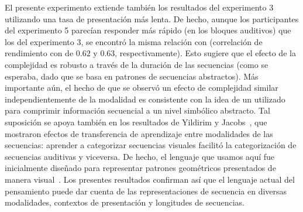 
El presente experimento extiende también los resultados del experimento 3 utilizando una tasa de presentación más lenta. De hecho, aunque los participantes del experimento 5 parecían responder más rápido (en los bloques auditivos) que los del experimento 3, se encontró la misma relación con \mdlbin (correlación de rendimiento con \mdlbin de $0.62$ y $0.63$, respectivamente). Esto sugiere que el efecto de la complejidad es robusto a través de la duración de las secuencias (como se esperaba, dado que \mdlbin se basa en patrones de secuencias abstractos). Más importante aún, el hecho de que se observó un efecto de complejidad similar independientemente de la modalidad es consistente con la idea de un \lot utilizado para comprimir información secuencial a un nivel simbólico abstracto. Tal suposición se apoya también en los resultados de Yildirim y Jacobs~\cite{yildirim2015learning}, que mostraron efectos de transferencia de aprendizaje entre modalidades de las secuencias: aprender a categorizar secuencias visuales facilitó la categorización de secuencias auditivas y viceversa. De hecho, el lenguaje que usamos aquí fue inicialmente diseñado para representar patrones geométricos presentados de manera visual~\cite{amalric2017language}. Los presentes resultados confirman así que el lenguaje actual del pensamiento puede dar cuenta de las representaciones de secuencia en diversas modalidades, contextos de presentación y longitudes de secuencias.

